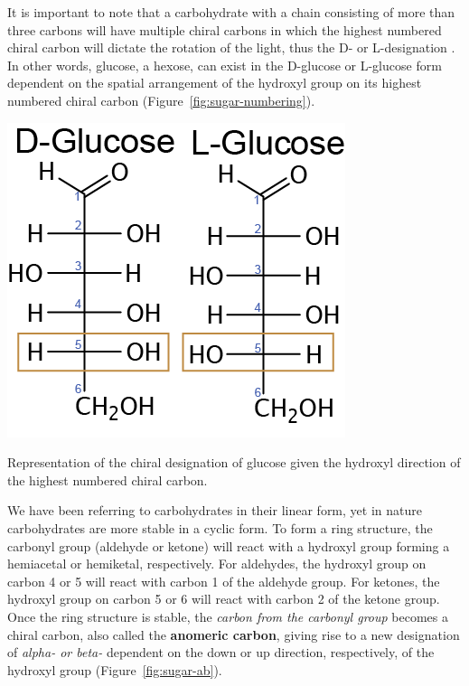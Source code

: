 \documentclass{tufte-handout}
\begin{document}
It is important to note that a carbohydrate with a chain consisting of more than three carbons will have multiple chiral carbons in which the highest numbered chiral carbon will dictate the rotation of the light, thus the D- or L-designation . In other words, glucose, a hexose, can exist in the D-glucose or L-glucose form dependent on the spatial arrangement of the hydroxyl group on its highest numbered chiral carbon (Figure~\ref{fig:sugar-numbering}).

\begin{marginfigure}
\includegraphics{figures/Glucose-DL.png}
\caption{Representation of the chiral designation of glucose given the hydroxyl direction of the highest numbered chiral carbon.}\label{fig:sugar-numbering}
\end{marginfigure}

 We have been referring to carbohydrates in their linear form, yet in nature carbohydrates are more stable in a cyclic form. To form a ring structure, the carbonyl group (aldehyde or ketone) will react with a hydroxyl group forming a hemiacetal or hemiketal, respectively. For aldehydes, the hydroxyl group on carbon 4 or 5 will react with carbon 1 of the aldehyde group. For ketones, the hydroxyl group on carbon 5 or 6 will react with carbon 2 of the ketone group. Once the ring structure is stable, the \emph{carbon from the carbonyl group} becomes a chiral
carbon, also called the \textbf{anomeric carbon}, giving rise to a new designation of \emph{alpha- or beta-} dependent on the down or up direction, respectively, of the hydroxyl group (Figure~\ref{fig:sugar-ab}).
\end{document}
